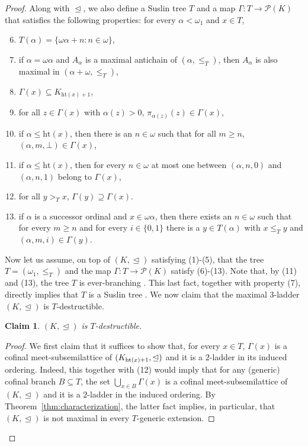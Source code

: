 \documentclass[]{amsart}
\newtheorem{claim}{Claim}[theorem]
\theoremstyle{definition}
\theoremstyle{remark}
\begin{document}
\begin{proof}
Along with $\trianglelefteq$, we also define a Suslin tree $T$ and a map $\Gamma : T \rightarrow \mathcal{P}(K)$ that satisfies the following properties: for every $\alpha < \omega_1$ and $x \in T$,
\begin{enumerate}
\setcounter{enumi}{5}
\item $T(\alpha) = \{\omega\alpha+n : n\in\omega\}$,
\item if $\alpha = \omega\alpha$ and $A_\alpha$ is a maximal antichain of $(\alpha, \le_T)$, then $A_\alpha$ is also maximal in $(\alpha + \omega, \le_T)$,
\item $\Gamma(x) \subseteq K_{\mathrm{ht}(x)+1}$,
\item for all $z \in \Gamma(x)$ with $\alpha(z) > 0$,  $\pi_{\alpha(z)}(z) \in \Gamma(x)$,
\item if $\alpha \le \mathrm{ht}(x)$, then there is an $n\in\omega$ such that for all $m \ge n$, $(\alpha, m, \bot) \in \Gamma(x)$,
\item if $\alpha \le \mathrm{ht}(x)$, then for every $n\in\omega$ at most one between $(\alpha, n, 0)$ and $(\alpha, n, 1)$ belong to $\Gamma(x)$,
\item for all $y >_T x$, $\Gamma(y) \supseteq \Gamma(x)$.
\item if $\alpha$ is a successor ordinal and $x \in \omega\alpha$, then there exists an $n \in\omega$ such that for every $m \ge n$ and for every $i \in \{0,1\}$ there is a $y \in T(\alpha)$ with $x \le_T y$ and $(\alpha, m, i) \in \Gamma(y)$.
\end{enumerate}

Now let us assume, on top of $(K, \trianglelefteq)$ satisfying (1)-(5), that the tree $T = (\omega_1, \le_T)$ and the map $\Gamma : T \rightarrow \mathcal{P}(K)$ satisfy (6)-(13). Note that, by (11) and (13), the tree $T$ is ever-branching \cite[Definition 7.3]{MR756630}. This last fact, together with property (7), directly implies that $T$ is a Suslin tree \cite[Lemma 7.7]{MR756630}. We now claim that the maximal $3$-ladder $(K, \trianglelefteq)$ is $T$-destructible. 

\begin{claim}
$(K, \trianglelefteq)$ is $T$-destructible.
\end{claim}
\begin{proof}

We first claim that it suffices to show that, for every $x \in T$, $\Gamma(x)$ is a cofinal meet-subsemilattice of $(K_{\mathrm{ht}(x)+1}, \trianglelefteq\nobreak)$ and it is a $2$-ladder in its induced ordering. Indeed, this together with (12) would imply that for any (generic) cofinal branch $B \subseteq T$, the set $\bigcup_{x \in B} \Gamma(x)$ is a cofinal meet-subsemilattice of $(K, \trianglelefteq)$ and it is a $2$-ladder in the induced ordering. By Theorem~\ref{thm:characterization}, the latter fact implies, in particular, that $(K, \trianglelefteq)$ is not maximal in every $T$-generic extension.


\end{proof}
\end{proof}
\end{document}

